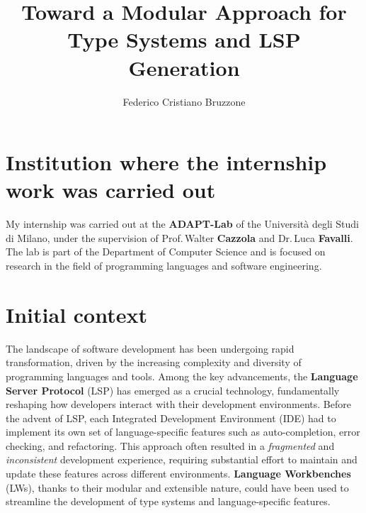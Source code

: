 \documentclass{adapt-lab}
\begin{document}
\title{Toward a Modular Approach for Type Systems and LSP \\ Generation \\}
\author{Federico Cristiano Bruzzone}

\makefirstpage

%
%

\break

\section{Institution where the internship work was carried out}

My internship was carried out at the \textbf{ADAPT-Lab} of the Universit\`a degli Studi di Milano, under the supervision of Prof.\,Walter \textbf{Cazzola} and Dr.\,Luca \textbf{Favalli}.
 The lab is part of the Department of Computer Science and is focused on research in the field of programming languages and software engineering.

\section{Initial context}

The landscape of software development has been undergoing rapid transformation, driven by the increasing complexity and diversity of programming languages and tools. Among the key advancements, the \textbf{Language Server Protocol} (LSP) has emerged as a crucial technology, fundamentally reshaping how developers interact with their development environments. Before the advent of LSP, each Integrated Development Environment (IDE) had to implement its own set of language-specific features such as auto-completion, error checking, and refactoring. This approach often resulted in a \textit{fragmented} and \textit{inconsistent} development experience, requiring substantial effort to maintain and update these features across different environments. \textbf{Language Workbenches} (LWs), thanks to their modular and extensible nature, could have been used to streamline the development of type systems and language-specific features.
\end{document}
